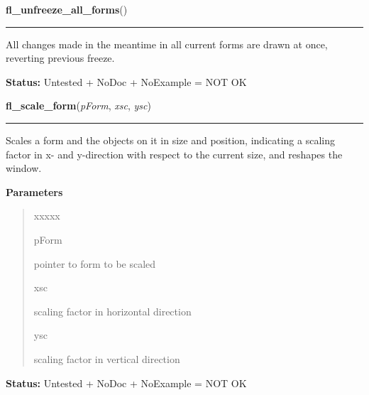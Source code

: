 \hspace{.8\funcindent}\begin{boxedminipage}{\funcwidth}

    \raggedright \textbf{fl\_unfreeze\_all\_forms}()

    \vspace{-1.5ex}

    \rule{\textwidth}{0.5\fboxrule}
\setlength{\parskip}{2ex}
    All changes made in the meantime in all current forms are drawn at 
    once, reverting previous freeze.

\setlength{\parskip}{1ex}
\textbf{Status:} Untested + NoDoc + NoExample = NOT OK



    \end{boxedminipage}

    \label{xformslib:library:fl_scale_form}

    \vspace{0.5ex}

\hspace{.8\funcindent}\begin{boxedminipage}{\funcwidth}

    \raggedright \textbf{fl\_scale\_form}(\textit{pForm}, \textit{xsc}, \textit{ysc})

    \vspace{-1.5ex}

    \rule{\textwidth}{0.5\fboxrule}
\setlength{\parskip}{2ex}
    Scales a form and the objects on it in size and position, indicating a 
    scaling factor in x- and y-direction with respect to the current size, 
    and reshapes the window.

\setlength{\parskip}{1ex}
      \textbf{Parameters}
      \vspace{-1ex}

      \begin{quote}
        \begin{Ventry}{xxxxx}

          \item[pForm]

          pointer to form to be scaled

          \item[xsc]

          scaling factor in horizontal direction

          \item[ysc]

          scaling factor in vertical direction

        \end{Ventry}

      \end{quote}

\textbf{Status:} Untested + NoDoc + NoExample = NOT OK



    \end{boxedminipage}

